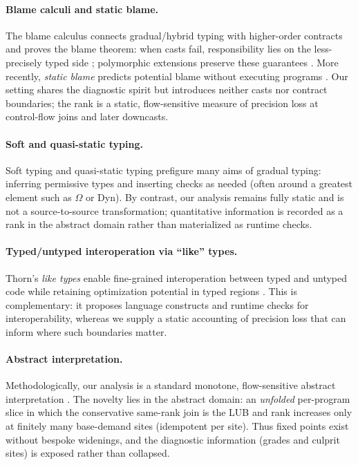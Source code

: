 \paragraph{Blame calculi and static blame.}
The blame calculus connects gradual/hybrid typing with higher-order contracts and proves the blame theorem: when casts fail, responsibility lies on the less-precisely typed side \cite{WadlerFindler2009}; polymorphic extensions preserve these guarantees \cite{AhmedFindlerSiekWadler2011}. More recently, \emph{static blame} predicts potential blame without executing programs \cite{SuCulpepper2024}. Our setting shares the diagnostic spirit but introduces neither casts nor contract boundaries; the rank is a static, flow-sensitive measure of precision loss at control-flow joins and later downcasts.

\paragraph{Soft and quasi-static typing.}
Soft typing \cite{CartwrightFagan1991} and quasi-static typing \cite{Thatte1990} prefigure many aims of gradual typing: inferring permissive types and inserting checks as needed (often around a greatest element such as $\Omega$ or \textsf{Dyn}). By contrast, our analysis remains fully static and is not a source-to-source transformation; quantitative information is recorded as a rank in the abstract domain rather than materialized as runtime checks.

\paragraph{Typed/untyped interoperation via ``like'' types.}
Thorn’s \emph{like types} enable fine-grained interoperation between typed and untyped code while retaining optimization potential in typed regions \cite{WrigstadEtAl2010}. This is complementary: it proposes language constructs and runtime checks for interoperability, whereas we supply a static accounting of precision loss that can inform where such boundaries matter.

\paragraph{Abstract interpretation.}
Methodologically, our analysis is a standard monotone, flow-sensitive abstract interpretation \cite{CousotCousot1977}. The novelty lies in the abstract domain: an \emph{unfolded} per-program slice in which the conservative same-rank join is the LUB and rank increases only at finitely many base-demand sites (idempotent per site). Thus fixed points exist without bespoke widenings, and the diagnostic information (grades and culprit sites) is exposed rather than collapsed.

